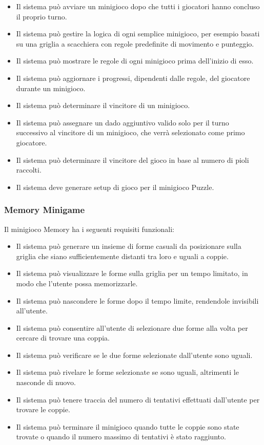 \begin{itemize}
      \item Il sistema può avviare un minigioco dopo che tutti i giocatori hanno concluso
            il proprio turno.
      \item Il sistema può gestire la logica di ogni semplice minigioco, per esempio 
            basati su una griglia a scacchiera con regole predefinite di movimento e punteggio.
      \item Il sistema può mostrare le regole di ogni minigioco prima dell'inizio di esso.
      \item Il sistema può aggiornare i progressi, dipendenti dalle regole, del giocatore 
            durante un minigioco.
      \item Il sistema può determinare il vincitore di un minigioco.
      \item Il sistema può assegnare un dado aggiuntivo valido solo per il turno successivo al
            vincitore di un minigioco, che verrà selezionato come primo giocatore.
      \item Il sistema può determinare il vincitore del gioco in base al numero di pioli raccolti.
      \item Il sistema deve generare setup di gioco per il minigioco Puzzle.
\end{itemize}

\subsubsection{Memory Minigame} \label{sec:functional-requirements:memory}
Il minigioco Memory ha i seguenti requisiti funzionali:
\begin{itemize}
      \item Il sistema può generare un insieme di forme casuali da posizionare sulla griglia che siano 
            sufficientemente distanti tra loro e uguali a coppie.
      \item Il sistema può visualizzare le forme sulla griglia per un tempo limitato, in modo che l'utente
            possa memorizzarle.
      \item Il sistema può nascondere le forme dopo il tempo limite, rendendole invisibili all'utente.
      \item Il sistema può consentire all'utente di selezionare due forme alla volta
            per cercare di trovare una coppia.
      \item Il sistema può verificare se le due forme selezionate dall'utente sono uguali.
      \item Il sistema può rivelare le forme selezionate se sono uguali, altrimenti le nasconde di nuovo.
      \item Il sistema può tenere traccia del numero di tentativi effettuati dall'utente per trovare le coppie.
      \item Il sistema può terminare il minigioco quando tutte le coppie sono state trovate o quando il numero massimo di tentativi
            è stato raggiunto.
\end{itemize}